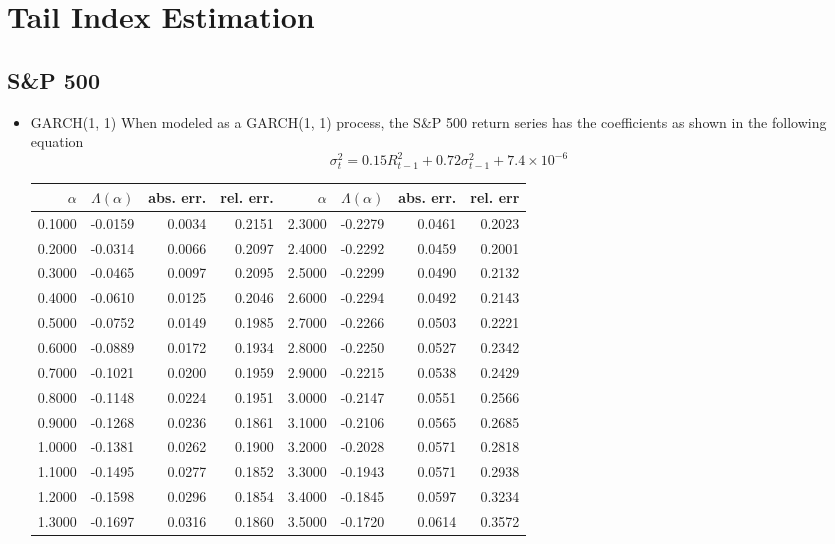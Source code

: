 \documentclass{article}
\theoremstyle{remark}
\begin{document}
\fi

\section{Tail Index Estimation}
\subsection{S\&P 500}
\begin{itemize}
\item GARCH(1, 1)
  When modeled as a GARCH(1, 1) process, the S\&P 500 return series
  has the coefficients as shown in the following equation
  \[
  \sigma_t^2 = 0.15 R_{t-1}^2 + 0.72 \sigma_{t-1}^2 + 7.4 \times 10^{-6}
  \]
  \begin{table}[htb!]
    \centering
    \begin{tabular}{r|r|r|r||r|r|r|r}
      $\alpha$ & $\Lambda(\alpha)$ & abs. err. & rel. err. & $\alpha$
      & $\Lambda(\alpha)$ & abs. err. & rel. err \\
      \hline
      0.1000 & -0.0159 & 0.0034 & 0.2151 & 2.3000 & -0.2279 & 0.0461 & 0.2023\\
      0.2000 & -0.0314 & 0.0066 & 0.2097 & 2.4000 & -0.2292 & 0.0459 & 0.2001\\
      0.3000 & -0.0465 & 0.0097 & 0.2095 & 2.5000 & -0.2299 & 0.0490 & 0.2132\\
      0.4000 & -0.0610 & 0.0125 & 0.2046 & 2.6000 & -0.2294 & 0.0492 & 0.2143\\
      0.5000 & -0.0752 & 0.0149 & 0.1985 & 2.7000 & -0.2266 & 0.0503 & 0.2221\\
      0.6000 & -0.0889 & 0.0172 & 0.1934 & 2.8000 & -0.2250 & 0.0527 & 0.2342\\
      0.7000 & -0.1021 & 0.0200 & 0.1959 & 2.9000 & -0.2215 & 0.0538 & 0.2429\\
      0.8000 & -0.1148 & 0.0224 & 0.1951 & 3.0000 & -0.2147 & 0.0551 & 0.2566\\
      0.9000 & -0.1268 & 0.0236 & 0.1861 & 3.1000 & -0.2106 & 0.0565 & 0.2685\\
      1.0000 & -0.1381 & 0.0262 & 0.1900 & 3.2000 & -0.2028 & 0.0571 & 0.2818\\
      1.1000 & -0.1495 & 0.0277 & 0.1852 & 3.3000 & -0.1943 & 0.0571 & 0.2938\\
      1.2000 & -0.1598 & 0.0296 & 0.1854 & 3.4000 & -0.1845 & 0.0597 & 0.3234\\
      1.3000 & -0.1697 & 0.0316 & 0.1860 & 3.5000 & -0.1720 & 0.0614 & 0.3572\\

\end{tabular}
\end{table}
\end{itemize}
\end{document}

